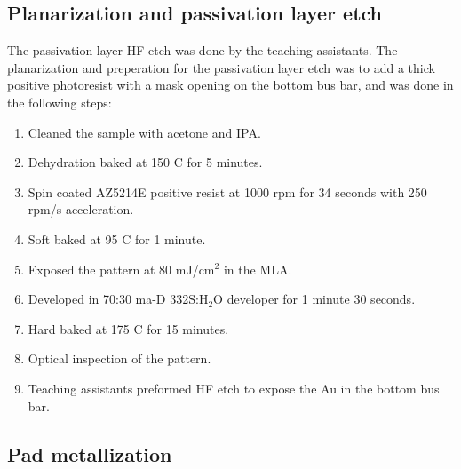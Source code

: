 \subsection{Planarization and passivation layer etch}
\label{methods:Planarization}

\noindent The passivation layer HF etch was done by the teaching assistants.
The planarization and preperation for the passivation layer etch was to add a thick positive photoresist with a mask opening on the bottom bus bar, and was done in the following steps:

\begin{enumerate}
    \item Cleaned the sample with acetone and IPA.
    \item Dehydration baked at 150 \textdegree C for 5 minutes.
    \item Spin coated AZ5214E positive resist at 1000 rpm for 34 seconds with 250 rpm/s acceleration.
    \item Soft baked at 95 \textdegree C for 1 minute.
    \item Exposed the pattern at 80 mJ/cm$^2$ in the MLA.
    \item Developed in 70:30 ma-D 332S:H$_2$O developer for 1 minute 30 seconds.
    \item Hard baked at 175 \textdegree C for 15 minutes.
    \item Optical inspection of the pattern.
    \item Teaching assistants preformed HF etch to expose the Au in the bottom bus bar.
\end{enumerate}



\subsection{Pad metallization}
\label{methods:pad_metallization}

